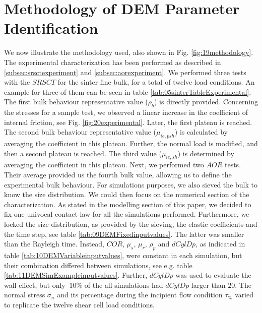\section{Methodology of DEM Parameter Identification}
\label{sec:methodology}

We now illustrate the methodology used, also shown in Fig.
\ref{fig:19methodology}.
%
The experimental characterization has been performed as described in
\ref{subsec:srsctexperiment} and \ref{subsec:aorexperiment}. We performed
three tests with the $SRSCT$ for the sinter fine bulk, for a total of twelve
load conditions. An example for three of them can be seen in table \ref{tab:05sinterTableExperimental}.
% 
The first bulk behaviour representative value ($\rho_b$) is directly provided. 
Concerning the stresses for a sample test, we observed a linear increase in the
coefficient of internal friction, see Fig. \ref{fig:20experimental}.
Later, the first plateau is reached. 
The second bulk behaviour representative value ($\mu_{ie,psh}$) is calculated by averaging the coefficient in this plateau. 
Further, the normal load is modified, and then a second plateau is reached. The third value ($\mu_{ie,sh}$) is 
determined by averaging the coefficient in this plateau. 
Next, we performed two $AOR$ tests. 
Their average provided us the fourth bulk value, allowing us to define the experimental bulk behaviour. 
For simulations purposes, we also sieved the bulk to know the size distribution.
We could then focus on the numerical section of the characterization. 
As stated in the modelling section of this paper, we decided to fix one univocal contact law for all the simulations performed. 
Furthermore, we locked the size distribution, as provided by the sieving, the
elastic coefficients and the time step, see table
\ref{tab:09DEMFixedinputvalues}.
% 
% 
The latter was smaller than the Rayleigh time. Instead, $COR$, $\mu_s$, $\mu_r$,
$\rho_p$ and $dCylDp$, as indicated in table \ref{tab:10DEMVariableinputvalues},
were constant in each simulation, but their combination differed between
simulations, see e.g. table \ref{tab:11DEMSimExampleinputvalues}.
% 
Further, $dCylDp$ was used to evaluate the wall effect, but only $~10\%$ of the
all simulations had $dCylDp$ larger than $20$. The normal stress $\sigma_n$ and its
percentage during the incipient flow condition $\tau_{\%}$
varied to replicate the twelve shear cell load conditions. 
